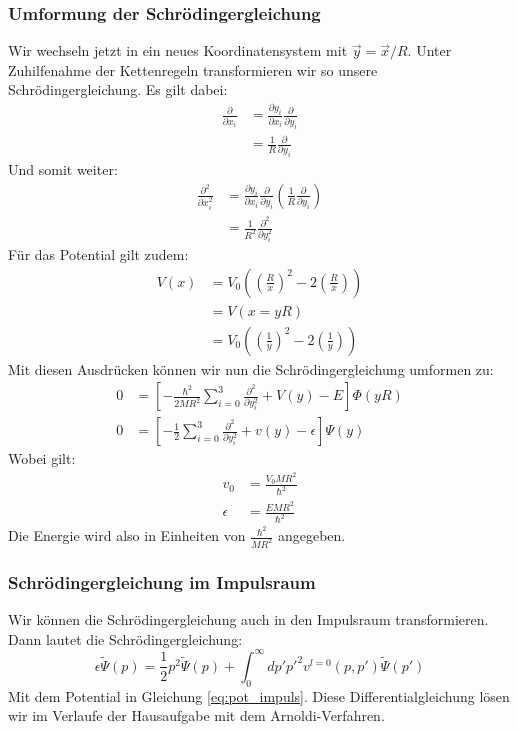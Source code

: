 \documentclass[11pt,a4paper]{article}
\begin{document}
\subsubsection*{Umformung der Schrödingergleichung}
Wir wechseln jetzt in ein neues Koordinatensystem mit $\vec{y} = \vec{x}/R$. Unter Zuhilfenahme der Kettenregeln transformieren wir so unsere Schrödingergleichung. Es gilt dabei:
\begin{align*}
	\frac{\partial}{\partial x_i} &= \frac{\partial y_i}{\partial x_i}\frac{\partial}{\partial y_i} \\
	&=\frac{1}{R}\frac{\partial}{\partial y_i}
\end{align*}
Und somit weiter:
\begin{align*}
	\frac{\partial^2}{\partial x_i^2} &= \frac{\partial y_i}{\partial x_i}\frac{\partial}{\partial y_i}\left(\frac{1}{R}\frac{\partial}{\partial y_i}\right) \\
	&= \frac{1}{R^2}\frac{\partial^2}{\partial y_i^2}
\end{align*}
Für das Potential gilt zudem:
\begin{align*}
	V(x) &= V_0\left(\left(\frac{R}{x}\right)^2 -2\left(\frac{R}{x}\right)\right) \\
	&= V(x=yR) \\
	&= V_0\left(\left(\frac{1}{y}\right)^2 -2\left(\frac{1}{y}\right)\right)
\end{align*}
Mit diesen Ausdrücken können wir nun die Schrödingergleichung umformen zu:
\begin{align}
	0 &= \left[-\frac{\hbar^2}{2MR^2}\sum_{i=0}^{3}\frac{\partial^2}{\partial y_i^2}+V(y) -E\right]\Phi(yR) \\
	0 &= \left[-\frac{1}{2}\sum_{i=0}^{3}\frac{\partial^2}{\partial y_i^2} + v(y) - \epsilon\right]\Psi(y)
\end{align}
Wobei gilt:
\begin{align*}
	v_0 &= \frac{V_0MR^2}{\hbar^2} \\
	\epsilon &= \frac{E MR^2}{\hbar^2}
\end{align*}
Die Energie wird also in Einheiten von $\frac{\hbar^2}{MR^2}$ angegeben.
\subsubsection*{Schrödingergleichung im Impulsraum}
Wir können die Schrödingergleichung auch in den Impulsraum transformieren. Dann lautet die Schrödingergleichung:
\begin{equation}
	\epsilon\tilde{\Psi}(p) = \frac{1}{2}p^2\tilde{\Psi}(p) +\int_{0}^{\infty}dp'p'^2v^{l=0}(p,p')\tilde{\Psi}(p')
\end{equation}
Mit dem Potential in Gleichung \ref{eq:pot_impuls}. Diese Differentialgleichung lösen wir im Verlaufe der Hausaufgabe mit dem Arnoldi-Verfahren.
\end{document}
